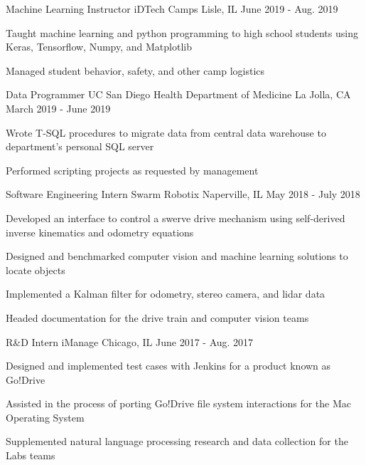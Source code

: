 
\begin{cventries}
  \cventry
    {Machine Learning Instructor} %
    {iDTech Camps} %
    {Lisle, IL} %
    {June 2019 - Aug. 2019} %
    {
      \begin{cvitems} %
        \item {Taught machine learning and python programming to high school students using Keras, Tensorflow, Numpy, and Matplotlib}
        \item {Managed student behavior, safety, and other camp logistics}
      \end{cvitems}
    }

  \cventry
    {Data Programmer} %
    {UC San Diego Health Department of Medicine} %
    {La Jolla, CA} %
    {March 2019 - June 2019} %
    {
      \begin{cvitems} %
        \item {Wrote T-SQL procedures to migrate data from central data warehouse to department's personal SQL server}
        \item {Performed scripting projects as requested by management}
      \end{cvitems}
    }

  \cventry
    {Software Engineering Intern} %
    {Swarm Robotix} %
    {Naperville, IL} %
    {May 2018 - July 2018} %
    {
      \begin{cvitems} %
        \item {Developed an interface to control a swerve drive mechanism using self-derived inverse kinematics and odometry equations}
        \item {Designed and benchmarked computer vision and machine learning solutions to locate objects}
        \item {Implemented a Kalman filter for odometry, stereo camera, and lidar data}
        \item {Headed documentation for the drive train and computer vision teams}
      \end{cvitems}
    }

  \cventry
    {R\&D Intern} %
    {iManage} %
    {Chicago, IL} %
    {June 2017 - Aug. 2017} %
    {
      \begin{cvitems} %
        \item {Designed and implemented test cases with Jenkins for a product known as Go!Drive}
		\item {Assisted in the process of porting Go!Drive file system interactions for the Mac Operating System}
		\item {Supplemented natural language processing research and data collection for the Labs teams}
      \end{cvitems}
    }

 
\end{cventries}
